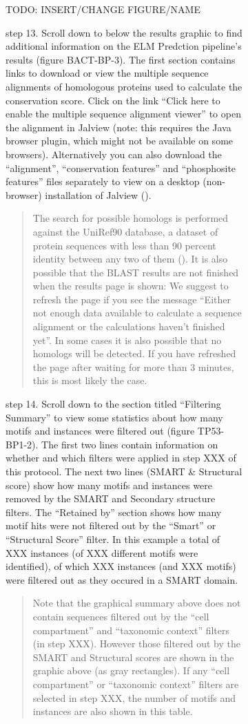 {\begin{figure}[h!]
{{\begin{figure}[h!]
{{\begin{figure}[h!]
{}
\end{figure}
TODO: INSERT/CHANGE FIGURE/NAME

step 13. Scroll down to below the results graphic to find additional
information on the ELM Predction pipeline's results (figure BACT-BP-3).
The first section contains links to download or view the multiple
sequence alignments of homologous proteins used to calculate the
conservation score. Click on the link ``Click here to enable the
multiple sequence alignment viewer'' to open the alignment in Jalview
(note: this requires the Java browser plugin, which might not be
available on some browsers). Alternatively you can also download the
``alignment'', ``conservation features'' and ``phosphosite features''
files separately to view on a desktop (non-browser) installation of
Jalview (\cite{19151095}).

\begin{quote}
The search for possible homologs is performed against the UniRef90
database, a dataset of protein sequences with less than 90 percent
identity between any two of them (\cite{17379688}). It is also possible
that the BLAST results are not finished when the results page is shown:
We suggest to refresh the page if you see the message ``Either not
enough data available to calculate a sequence alignment or the
calculations haven't finished yet''. In some cases it is also possible
that no homologs will be detected. If you have refreshed the page after
waiting for more than 3 minutes, this is most likely the case.
\end{quote}

step 14. Scroll down to the section titled ``Filtering Summary'' to view
some statistics about how many motifs and instances were filtered out
(figure TP53-BP1-2). The first two lines contain information on whether
and which filters were applied in step XXX of this protocol. The next
two lines (SMART \& Structural score) show how many motifs and instances
were removed by the SMART and Secondary structure filters. The
``Retained by'' section shows how many motif hits were not filtered out
by the ``Smart'' or ``Structural Score'' filter. In this example a total
of XXX instances (of XXX different motifs were identified), of which XXX
instances (and XXX motifs) were filtered out as they occured in a SMART
domain.

\begin{quote}
Note that the graphical summary above does not contain sequences
filtered out by the ``cell compartment'' and ``taxonomic context''
filters (in step XXX). However those filtered out by the SMART and
Structural scores are shown in the graphic above (as gray rectangles).
If any ``cell compartment'' or ``taxonomic context'' filters are
selected in step XXX, the number of motifs and instances are also shown
in this table.
\end{quote}

}}
\end{figure}}}
\end{figure}}

